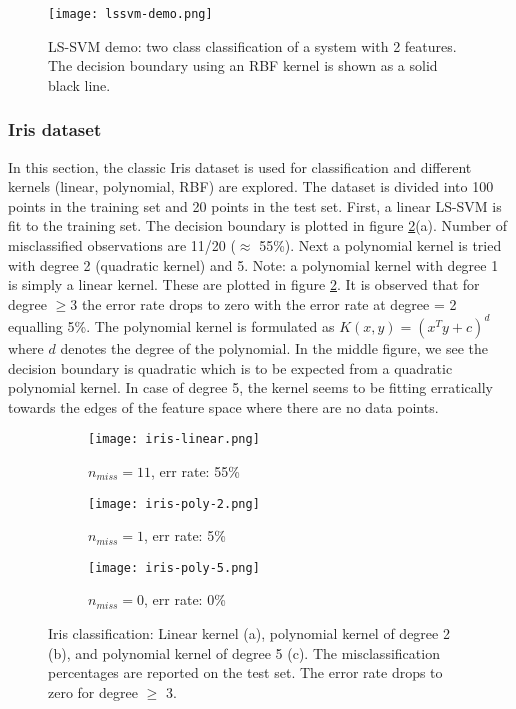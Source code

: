 \documentclass[paper=a4, fontsize=11pt]{scrartcl} %
\numberwithin{equation}{section} %
\begin{document}
\begin{figure}[ht]
\centering
\texttt{[image: lssvm-demo.png]}
\caption{LS-SVM demo: two class classification of a system with 2 features. The decision boundary using an RBF kernel is shown as a solid black line.}
\label{svm-demo}
\end{figure}

\subsubsection{Iris dataset}

In this section, the classic Iris dataset is used for classification and different kernels (linear, polynomial, RBF) are explored. The dataset is divided into 100 points in the training set and 20 points in the test set. First, a linear LS-SVM is fit to the training set. The decision boundary is plotted in figure \ref{iris-poly}(a). Number of misclassified observations are 11/20 ($\approx$ 55\%). Next a polynomial kernel is tried with degree 2 (quadratic kernel) and 5. Note: a polynomial kernel with degree 1 is simply a linear kernel. These are plotted in figure \ref{iris-poly}. It is observed that for degree $\geq 3$ the error rate drops to zero with the error rate at degree = 2 equalling 5\%. The polynomial kernel is formulated as $K(x,y) = (x^T y + c)^d$ where $d$ denotes the degree of the polynomial. In the middle figure, we see the decision boundary is quadratic which is to be expected from a quadratic polynomial kernel. In case of degree 5, the kernel seems to be fitting erratically towards the edges of the feature space where there are no data points. 

\begin{figure}[ht]
\centering
	\begin{subfigure}[b]{0.3\textwidth}
		\centering
		\texttt{[image: iris-linear.png]}
		\caption{$n_{miss} = 11$, err rate: 55\%}
	\end{subfigure}
	\begin{subfigure}[b]{0.3\textwidth}
		\centering
		\texttt{[image: iris-poly-2.png]}
		\caption{$n_{miss} = 1$, err rate: 5\%}
	\end{subfigure}
	\begin{subfigure}[b]{0.3\textwidth}
		\centering
		\texttt{[image: iris-poly-5.png]}
		\caption{$n_{miss} = 0$, err rate:  0\%}
	\end{subfigure}
\caption{Iris classification: Linear kernel (a), polynomial kernel of degree 2 (b), and polynomial kernel of degree 5 (c). The misclassification percentages are reported on the test set. The error rate drops to zero for degree $\geq$ 3.}
\label{iris-poly}
\end{figure} 
\end{document}
